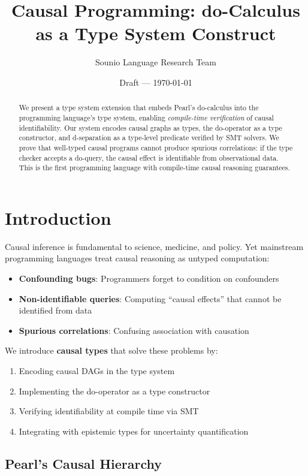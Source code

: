 \documentclass[11pt]{article}
\title{Causal Programming: do-Calculus as a Type System Construct}
\author{Sounio Language Research Team}
\date{Draft --- \today}
\begin{document}
\maketitle

\begin{abstract}
We present a type system extension that embeds Pearl's do-calculus into the programming language's type system, enabling \emph{compile-time verification} of causal identifiability. Our system encodes causal graphs as types, the do-operator as a type constructor, and d-separation as a type-level predicate verified by SMT solvers. We prove that well-typed causal programs cannot produce spurious correlations: if the type checker accepts a do-query, the causal effect is identifiable from observational data. This is the first programming language with compile-time causal reasoning guarantees.
\end{abstract}

\section{Introduction}

Causal inference is fundamental to science, medicine, and policy. Yet mainstream programming languages treat causal reasoning as untyped computation:
\begin{itemize}
\item \textbf{Confounding bugs}: Programmers forget to condition on confounders
\item \textbf{Non-identifiable queries}: Computing ``causal effects'' that cannot be identified from data
\item \textbf{Spurious correlations}: Confusing association with causation
\end{itemize}

\noindent We introduce \textbf{causal types} that solve these problems by:
\begin{enumerate}
\item Encoding causal DAGs in the type system
\item Implementing the do-operator as a type constructor
\item Verifying identifiability at compile time via SMT
\item Integrating with epistemic types for uncertainty quantification
\end{enumerate}

\subsection{Pearl's Causal Hierarchy}
\end{document}
